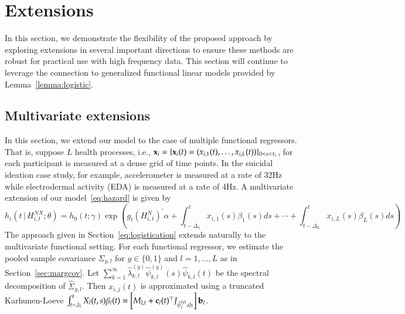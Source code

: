 \documentclass[12pt]{amsart}
\def\given{\, | \,}
\def\bfx{{\bf x}}
\begin{document}
\section{Extensions}

In this section, we demonstrate the flexibility of the proposed approach by exploring extensions in several important directions to ensure these methods are robust for practical use with high frequency data. This section will continue to leverage the connection to generalized functional linear models provided by Lemma~\ref{lemma:logistic}.

\subsection{Multivariate extensions}
\label{section:multiplesensors}

In this section, we extend our model to the case of multiple functional regressors.  That is, suppose $L$ health processes, i.e., $\bfx_i = \{ \bfx_i (t) = (x_{i,1} (t), \ldots, x_{i,L} (t)) \}_{0 < s < \tau_i}$, for each participant is measured at a dense grid of time points. In the suicidal ideation case study, for example, accelerometer is measured at a rate of 32Hz while electrodermal activity (EDA) is measured at a rate of 4Hz.  A multivariate extension of our model~\eqref{eq:hazard} is given by
\begin{equation}
\label{eq:multihazardlinear}
h_i \left( t \given  H_{i,t}^{NX} ; \theta \right) =
h_0 (t; \gamma) \exp \left( g_t \left( H_{i,t}^{N} \right)^{\prime} \alpha
  + \int_{t-\Delta_1}^t x_{i,1} (s) \beta_1(s) ds + \cdots + \int_{t-\Delta_L}^t x_{i,L} (s) \beta_L(s) ds  \right)
\end{equation}
The approach given in Section~\ref{eq:logistication} extends naturally to the multivariate functional setting. For each functional regressor, we estimate the pooled sample covariance $\Sigma_{y,l}$ for $y \in \{0,1\}$ and $l=1,\ldots,L$ as in Section~\ref{sec:margcov}.  Let $\sum_{k=1}^\infty \hat \lambda^{(y)}_{k,l} \hat \psi^{(y)}_{k,l} (s) \hat \psi_{k,l}(t)$ be the spectral decomposition of $\hat \Sigma_{y,l}$.  Then $x_{i,j}(t)$ is approximated using a truncated Karhunen-Loeve $\int_{t-\Delta_l}^t X_{l} (t,s) \beta_l(t) = \left[M_{l,t} + {\bf c}_l (t)^\top J_{\hat \psi_l^{(y)}, \phi_l} \right] {\bf b}_l$.
\end{document}
